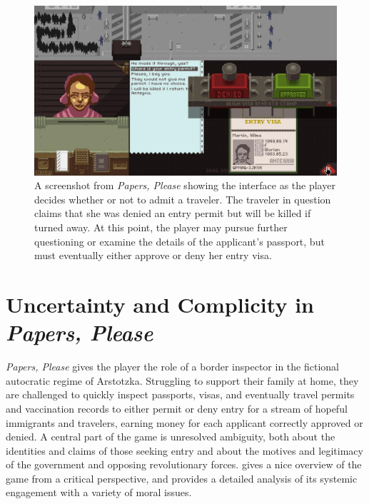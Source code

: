 \documentclass[arts,article,submit,moreauthors,pdftex,10pt,a4paper]{Definitions/mdpi}
\begin{document}
\begin{figure}[H]
  \includegraphics[width=\textwidth]{fig/papers-please-visa-choice.png}
  \caption{A screenshot from \emph{Papers, Please} showing the interface as the player decides whether or not to admit a traveler. The traveler in question claims that she was denied an entry permit but will be killed if turned away. At this point, the player may pursue further questioning or examine the details of the applicant's passport, but must eventually either approve or deny her entry visa.}
  \label{fig:PP_visa}
\end{figure}



\section{Uncertainty and Complicity in \emph{Papers, Please}}

\emph{Papers, Please} \citep{pope2013papers} gives the player the role of a border inspector in the fictional autocratic regime of Arstotzka.
%
Struggling to support their family at home, they are challenged to quickly inspect passports, visas, and eventually travel permits and vaccination records to either permit or deny entry for a stream of hopeful immigrants and travelers, earning money for each applicant correctly approved or denied.
%
A central part of the game is unresolved ambiguity, both about the identities and claims of those seeking entry and about the motives and legitimacy of the government and opposing revolutionary forces.
%
\cite{alexander2013designing} gives a nice overview of the game from a critical perspective, and \cite{formosa2016papers} provides a detailed analysis of its systemic engagement with a variety of moral issues.
\end{document}
